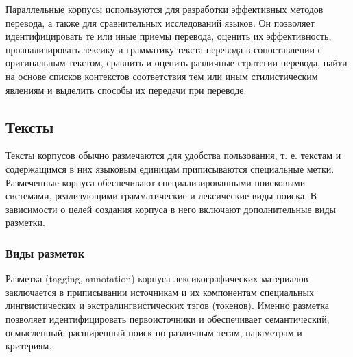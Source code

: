 Параллельные корпусы используются для разработки эффективных  методов перевода, а также для сравнительных исследований языков.
Он позволяет идентифицировать те или иные приемы перевода, оценить их эффективность, проанализировать лексику и грамматику текста перевода в сопоставлении с оригинальным текстом, сравнить и оценить различные стратегии перевода, найти на основе списков контекстов соответствия тем или иным стилистическим явлениям и выделить способы их передачи при переводе.~\cite{butenko2020-1}

\subsection{Тексты}

Тексты корпусов обычно размечаются для удобства пользования, т. е. текстам и содержащимся в них языковым единицам приписываются специальные метки.
Размеченные корпуса обеспечивают специализированными поисковыми системами, реализующими грамматические и лексические виды поиска.
В зависимости о целей создания корпуса в него включают дополнительные виды разметки.~\cite{butenko2020-2}

\subsubsection{Виды разметок}

Разметка (tagging, annotation) корпуса лексикографических материалов заключается в приписывании источникам и их компонентам специальных лингвистических и экстралингвистических тэгов (токенов).
Именно разметка позволяет идентифицировать первоисточники и обеспечивает семантический, осмысленный, расширенный поиск по различным тегам, параметрам и критериям.~\cite{lesnikov2019}

